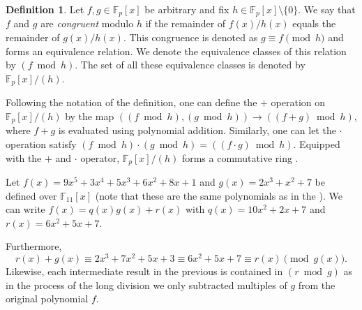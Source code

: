 \documentclass[openany, a4paper, 10pt]{book}
\theoremstyle{plain}
\theoremstyle{plain}
\theoremstyle{plain}
\theoremstyle{definition}
\newtheorem{definition}[theorem]{Definition}
\theoremstyle{plain}
\theoremstyle{definition}
\theoremstyle{remark}
\begin{document}
\begin{definition}\label{pol_mods}
    Let $f,g \in \mathbb F_p[x]$ be arbitrary and fix $h \in \mathbb F_p[x] \setminus \{ 0 \}$.
    We say that $f$ and $g$ are \textit{congruent} modulo $h$ if the remainder of $f(x)/h(x)$ equals the remainder of $g(x)/h(x)$.
    This congruence is denoted as $g \equiv f \pmod h$ and forms an equivalence relation.
    We denote the equivalence classes of this relation by $(f \bmod h)$.
    The set of all these equivalence classes is denoted by $\mathbb F_p[x]/(h)$.
\end{definition}
Following the notation of the definition, one can define the $+$ operation on $\mathbb F_p[x]/(h)$ by the map $((f \bmod h), (g \bmod h)) \to ((f+g) \bmod h)$, where $f+g$ is evaluated using polynomial addition.
Similarly, one can let the $\cdot$ operation satisfy $(f \bmod h) \cdot (g \bmod h) = ((f \cdot g) \bmod h)$.
Equipped with the $+$ and $\cdot$ operator, $\mathbb F_p[x]/(h)$ forms a commutative ring \cite[Theorem~1.3.8]{dictaat_joost}.


\begin{examplebox}
    Let
    $f(x)=9x^5 + 3x^4 + 5x^3 + 6x^2 + 8x + 1$ and
    $g(x)=2x^3 + x^2 + 7$ be defined over $\mathbb F_{11}[x]$
    (note that these are the same polynomials as in the ).
    We can write $f(x) = q(x)g(x) + r(x)$ with $q(x) = 10x^2+2x+7$ and $r(x)=6x^2+5x+7$.

    Furthermore,
    \begin{equation*}
        r(x) + g(x) \equiv 2x^3+7x^2+5x+3 \equiv 6x^2 + 5x + 7 \equiv r(x) \pmod {g(x)}.
    \end{equation*}
    Likewise, each intermediate result in the previous  is contained in $(r \bmod g)$
    as in the process of the long division we only subtracted multiples of $g$ from the original polynomial $f$.
\end{examplebox}
\end{document}
